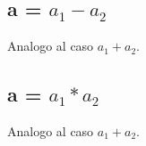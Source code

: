 \subsection{a = $a_1 - a_2$} Analogo al caso $a_1 + a_2$.

\subsection{a = $a_1 * a_2$} Analogo al caso $a_1 + a_2$.

